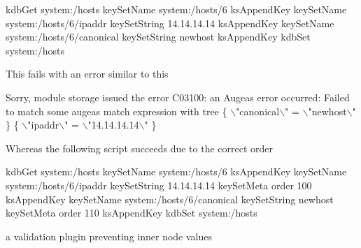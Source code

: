 \begin{DoxyCode}
kdbGet system:/hosts
keySetName system:/hosts/6
ksAppendKey
keySetName system:/hosts/6/ipaddr
keySetString 14.14.14.14
ksAppendKey
keySetName system:/hosts/6/canonical
keySetString newhost
ksAppendKey
kdbSet system:/hosts
\end{DoxyCode}


This fails with an error similar to this


\begin{DoxyCode}
Sorry, module storage issued the error C03100:
an Augeas error occurred: Failed to match
some augeas match expression
with tree
\{ \(\backslash\)"canonical\(\backslash\)" = \(\backslash\)"newhost\(\backslash\)" \} \{ \(\backslash\)"ipaddr\(\backslash\)" = \(\backslash\)"14.14.14.14\(\backslash\)" \}
\end{DoxyCode}


Whereas the following script succeeds due to the correct order


\begin{DoxyCode}
kdbGet system:/hosts
keySetName system:/hosts/6
ksAppendKey
keySetName system:/hosts/6/ipaddr
keySetString 14.14.14.14
keySetMeta order 100
ksAppendKey
keySetName system:/hosts/6/canonical
keySetString newhost
keySetMeta order 110
ksAppendKey
kdbSet system:/hosts
\end{DoxyCode}



\begin{DoxyItemize}
\item a validation plugin preventing inner node values 
\end{DoxyItemize}